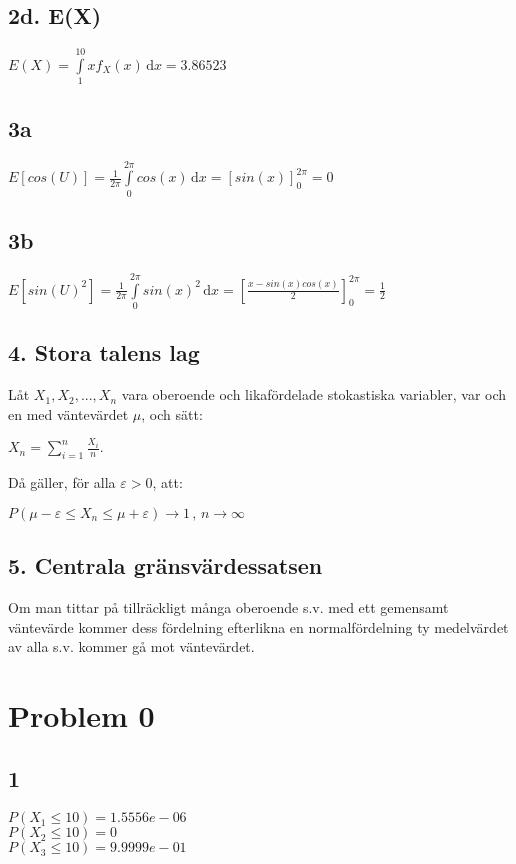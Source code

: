 \documentclass{article}
\begin{document}
\subsection*{2d. E(X)}
$E(X) = \int \limits_1^{10} xf_X(x)  \, \mathrm{d}x = 3.86523$

\subsection*{3a}
$
E[cos(U)] =
\frac{1}{2\pi} \int \limits_0^{2\pi} cos(x) \, \mathrm{d}x =
\left[sin(x)\right]_0^{2\pi} =
0
$

\subsection*{3b}

$
E[sin(U)^2] =
\frac{1}{2\pi} \int \limits_0^{2\pi} sin(x)^2 \, \mathrm{d}x =
\left[\frac{x-sin(x)cos(x)}{2}\right]_0^{2\pi} =
\frac{1}{2}
$

\subsection*{4. Stora talens lag}

Låt $ X_1, X_2, ..., X_n $ vara oberoende och likafördelade stokastiska
variabler, var och en med väntevärdet $\mu$, och sätt:

$
X_n = \sum\limits_{i=1}^{n}\frac{X_i}{n}.
$

Då gäller, för alla $\varepsilon > 0$, att:

$
P(\mu - \varepsilon \le X_n \le \mu + \varepsilon) \to 1 \, , \, n \to \infty
$
\subsection*{5. Centrala gränsvärdessatsen}

Om man tittar på tillräckligt många oberoende s.v. med ett gemensamt väntevärde
kommer dess fördelning efterlikna en normalfördelning ty medelvärdet av alla
s.v. kommer gå mot väntevärdet.

\section*{Problem 0}
\subsection*{1}
   
  $ P(X_1 \le 10) = 1.5556e-06 $      \\       
  $ P(X_2 \le 10) = 0 $               \\
  $ P(X_3 \le 10) = 9.9999e-01 $\\
  \\
\end{document}
